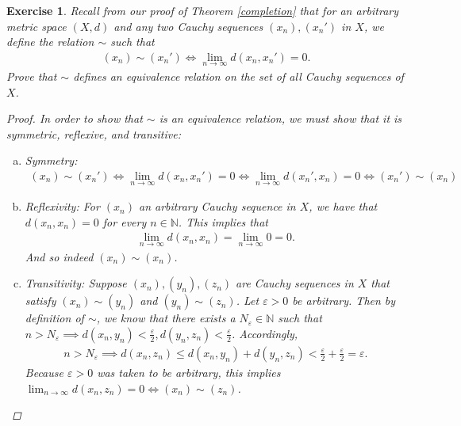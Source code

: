 \documentclass[11pt]{article}
\theoremstyle{mystyle}
\newtheorem{protoexer}{Exercise}[section]
\newenvironment{exer}
{\colorlet{shadecolor}{blue!15}\begin{shaded}\begin{protoexer}}
{\end{protoexer}\end{shaded}}
\newcommand{\0}{\mathbf{0}}
\begin{document}
\begin{exer}
Recall from our proof of Theorem \ref{completion} that for an arbitrary metric space $(X,d)$ and any two Cauchy sequences $(x_n), (x_n')$ in $X$, we define the relation $\sim$ such that
\begin{align*}
 (x_n) \sim (x_n') \iff \lim_{n \longrightarrow \infty} d(x_n, x_n') = 0.   
\end{align*}
Prove that $\sim$ defines an equivalence relation on the set of all Cauchy sequences of $X$.
\begin{proof}
In order to show that $\sim$ is an equivalence relation, we must show that it is symmetric, reflexive, and transitive:
\begin{enumerate}[(a)]
    \item Symmetry:
    \begin{align*}
    (x_n) \sim (x_n') \iff \lim_{n \longrightarrow \infty} d(x_n, x_n') = 0 \iff \lim_{n \longrightarrow \infty} d(x_n', x_n) = 0 \iff (x_n') \sim (x_n)
    \end{align*}
    \item Reflexivity:
    For $(x_n)$ an arbitrary Cauchy sequence in $X$, we have that $d(x_n, x_n) = 0$ for every $n \in \mathbb{N}$. This implies that
    \begin{align*}
        \lim_{n \longrightarrow \infty} d(x_n, x_n) = \lim_{n \longrightarrow \infty} 0 = 0. 
    \end{align*}
    And so indeed $(x_n) \sim (x_n)$.
    \item Transitivity: Suppose $(x_n), (y_n), (z_n)$ are Cauchy sequences in $X$ that satisfy $(x_n) \sim (y_n)$ and $(y_n) \sim (z_n)$. Let $\varepsilon > 0$ be arbitrary. Then by definition of $\sim$, we know that there exists a $N_{\varepsilon} \in \mathbb{N}$ such that $n > N_{\varepsilon} \implies d(x_n, y_n) < \frac{\varepsilon}{2}, d(y_n, z_n) < \frac{\varepsilon}{2}$. Accordingly,
    \begin{align*}
        n > N_{\varepsilon} \implies d(x_n, z_n) \leq d(x_n, y_n) + d(y_n, z_n) < \frac{\varepsilon}{2} + \frac{\varepsilon}{2} = \varepsilon.
    \end{align*}
    Because $\varepsilon > 0$ was taken to be arbitrary, this implies $\lim_{n \to \infty} d(x_n, z_n) = 0 \iff (x_n) \sim (z_n)$.
\end{enumerate}
\end{proof}
\end{exer}
\end{document}
